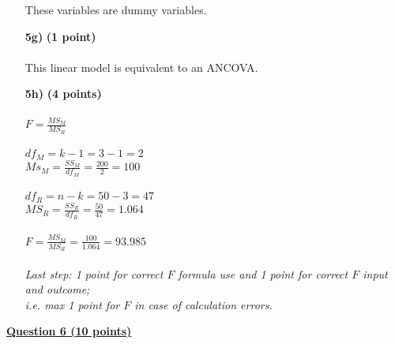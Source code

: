 \begin{itemize}
These variables are dummy variables. \\
\item[\textbf{5g)}] \textbf{(1 point)} \\ \\
This linear model is equivalent to an ANCOVA. \\
\item[\textbf{5h)}] \textbf{(4 points)} \\ \\
$F = \frac{MS_M}{MS_R}$ \\ \\
$df_M = k-1=3-1=2$ \\
$Ms_M = \frac{SS_M}{df_M} = \frac{200}{2} = 100$ \\ \\
$df_R = n - k = 50 - 3 = 47$ \\
$MS_R = \frac{SS_R}{df_R} = \frac{50}{47} = 1.064$ \\ \\ 
$F = \frac{MS_M}{MS_R} = \frac{100}{1.064} = 93.985$ \\ \\
\textit{Last step: 1 point for correct $F$ formula use and 1 point for correct $F$ input and outcome; \\i.e. max 1 point for $F$ in case of calculation errors.} \\
\end{itemize}

\underline{\textbf{Question 6 (10 points)}} \\

